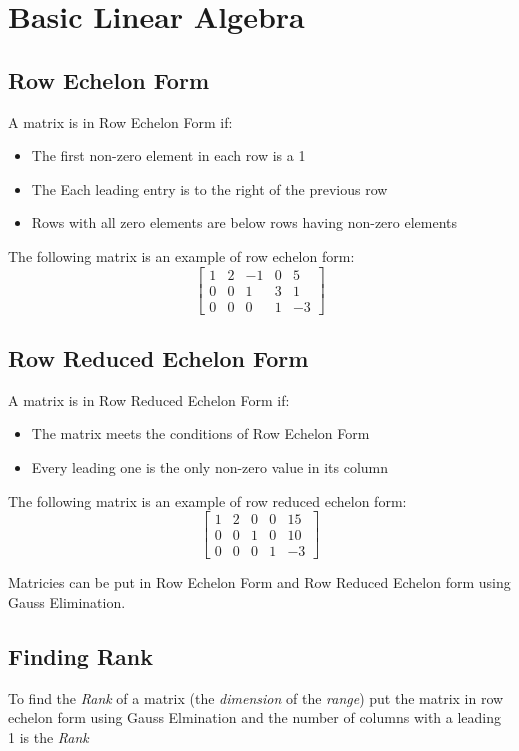 \documentclass[12pt]{article}
\begin{document}
\newpage
\section*{Basic Linear Algebra}
\subsection*{Row Echelon Form}
A matrix is in Row Echelon Form if:
\begin{itemize}
	\item The first non-zero element in each row is a 1
	\item The Each leading entry is to the right of the previous row
	\item Rows with all zero elements are below rows having non-zero elements
\end{itemize}
\noindent
The following matrix is an example of row echelon form:
$$
\begin{bmatrix}
	1 & 2 & -1 & 0 & 5 \\
	0 & 0 & 1 & 3 & 1 \\
	0 & 0 & 0 & 1 & -3 
\end{bmatrix} 
$$

\subsection*{Row Reduced Echelon Form}
A matrix is in Row Reduced Echelon Form if:
\begin{itemize}
	\item The matrix meets the conditions of Row Echelon Form
	\item Every leading one is the only non-zero value in its column
\end{itemize}
\noindent
The following matrix is an example of row reduced echelon form:
$$
\begin{bmatrix}
	1 & 2 & 0 & 0 & 15 \\
	0 & 0 & 1 & 0 & 10 \\
	0 & 0 & 0 & 1 & -3 
\end{bmatrix} 
$$

\noindent
Matricies can be put in Row Echelon Form and Row Reduced Echelon form using Gauss Elimination.

\subsection*{Finding Rank}
To find the {\em Rank} of a matrix (the {\em dimension} of the {\em range}) put the matrix in row echelon form using Gauss Elmination and the number of columns with a leading 1 is the {\em Rank}
\end{document}
